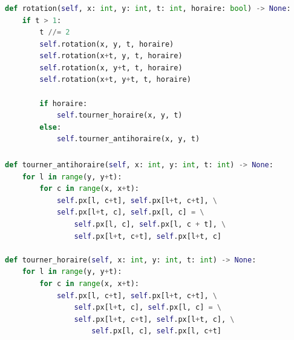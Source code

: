 \documentclass[svgnames,11pt]{beamer}
\begin{document}
\begin{frame}[fragile]
    \frametitle{}
    \begin{center}
        \begin{lstlisting}[language=Python , basicstyle=\ttfamily\small, xleftmargin=2em, xrightmargin=2em]
def rotation(self, x: int, y: int, t: int, horaire: bool) -> None:
    if t > 1:
        t //= 2
        self.rotation(x, y, t, horaire)
        self.rotation(x+t, y, t, horaire)
        self.rotation(x, y+t, t, horaire)
        self.rotation(x+t, y+t, t, horaire)

        if horaire:
            self.tourner_horaire(x, y, t)
        else:
            self.tourner_antihoraire(x, y, t)
\end{lstlisting}
        \label{CODE}
    \end{center}


\end{frame}
\begin{frame}[fragile]
    \frametitle{}

    \begin{center}
        \begin{lstlisting}[language=Python , basicstyle=\ttfamily\small, xleftmargin=0.1em, xrightmargin=-0.4em]
def tourner_antihoraire(self, x: int, y: int, t: int) -> None:
    for l in range(y, y+t):
        for c in range(x, x+t):
            self.px[l, c+t], self.px[l+t, c+t], \
            self.px[l+t, c], self.px[l, c] = \
                self.px[l, c], self.px[l, c + t], \
                self.px[l+t, c+t], self.px[l+t, c]

def tourner_horaire(self, x: int, y: int, t: int) -> None:
    for l in range(y, y+t):
        for c in range(x, x+t):
            self.px[l, c+t], self.px[l+t, c+t], \
                self.px[l+t, c], self.px[l, c] = \
                self.px[l+t, c+t], self.px[l+t, c], \
                    self.px[l, c], self.px[l, c+t]
\end{lstlisting}
        \label{CODE}
    \end{center}

\end{frame}
\end{document}
